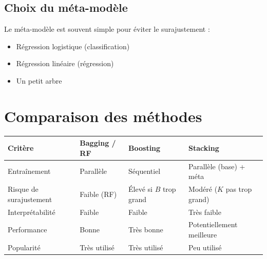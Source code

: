 \documentclass[a4paper,11pt]{article}
\begin{document}
\subsection{Choix du méta-modèle}

Le méta-modèle est souvent simple pour éviter le surajustement :
\begin{itemize}
    \item Régression logistique (classification)
    \item Régression linéaire (régression)
    \item Un petit arbre
\end{itemize}

\newpage

\section{Comparaison des méthodes}

\begin{tabular}{lp{3.5cm}p{3.5cm}p{3.5cm}}
\toprule
\textbf{Critère} & \textbf{Bagging / RF} & \textbf{Boosting} & \textbf{Stacking} \\
\midrule
Entraînement & Parallèle & Séquentiel & Parallèle (base) + méta \\
Risque de surajustement & Faible (RF) & Élevé si $B$ trop grand & Modéré ($K$ pas trop grand) \\
Interprétabilité & Faible & Faible & Très faible \\
Performance & Bonne & Très bonne & Potentiellement meilleure \\
Popularité & Très utilisé & Très utilisé & Peu utilisé \\
\bottomrule
\end{tabular}

\vspace{0.5cm}

\begin{center}
\end{center}
\end{document}
